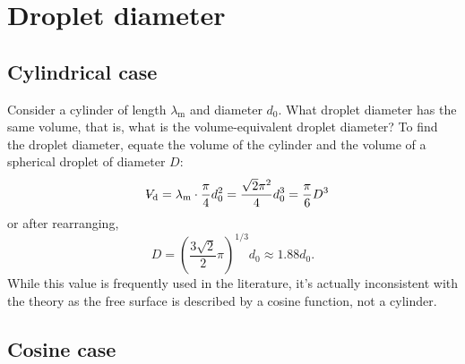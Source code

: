 \section{Droplet diameter}

\subsection{Cylindrical case}

Consider a cylinder of length $\lambda_\text{m}$ and diameter $d_0$. What droplet diameter has the same volume, that is, what is the volume-equivalent droplet diameter? To find the droplet diameter, equate the volume of the cylinder and the volume of a spherical droplet of diameter $D$:
\begin{equation}
   \Vol_\text{d} = \lambda_\text{m} \cdot \frac{\pi}{4} d_0^2 = \frac{\sqrt{2} \pi^2}{4} d_0^3 = \frac{\pi}{6} D^3
\end{equation}
or after rearranging,
\begin{equation}
   D = \left(\frac{3 \sqrt{2}}{2} \pi\right)^{1/3} d_0 \approx 1.88 d_0.
\end{equation}
While this value is frequently used in the literature, it's actually inconsistent with the theory as the free surface is described by a cosine function, not a cylinder.

\subsection{Cosine case}


